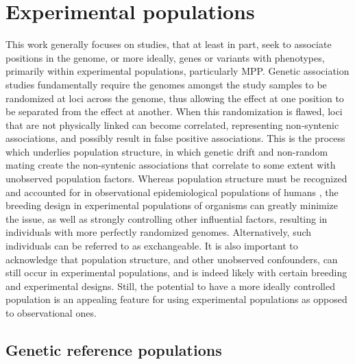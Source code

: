 \section{Experimental populations}

This work generally focuses on studies, that at least in part, seek to associate positions in the genome, or more ideally, genes or variants with phenotypes, primarily within experimental populations, particularly MPP. Genetic association studies fundamentally require the genomes amongst the study samples to be randomized at loci across the genome, thus allowing the effect at one position to be separated from the effect at another. When this randomization is flawed, loci that are not physically linked can become correlated, representing non-syntenic associations, and possibly result in false positive associations. This is the process which underlies population structure, in which genetic drift and non-random mating create the non-syntenic associations that correlate to some extent with unobserved population factors. Whereas population structure must be recognized and accounted for in observational epidemiological populations of humans \citep{Devlin1999,Hoffman2013}, the breeding design in experimental populations of organisms can greatly minimize the issue, as well as strongly controlling other influential factors, resulting in individuals with more perfectly randomized genomes. Alternatively, such individuals can be referred to as exchangeable. It is also important to acknowledge that population structure, and other unobserved confounders, can still occur in experimental populations, and is indeed likely with certain breeding and experimental designs. Still, the potential to have a more ideally controlled population is an appealing feature for using experimental populations as opposed to observational ones.

\subsection{Genetic reference populations}


